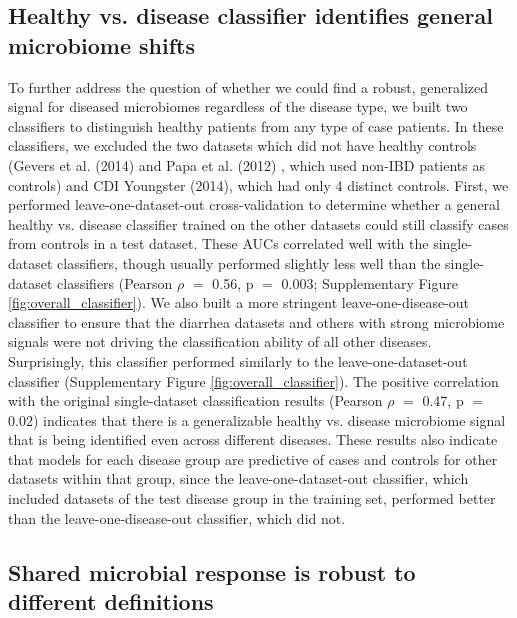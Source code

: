\subsection{Healthy vs. disease classifier identifies general microbiome shifts}\label{sec:overall_classifier}

To further address the question of whether we could find a robust, generalized signal for diseased microbiomes regardless of the disease type, we built two classifiers to distinguish healthy patients from any type of case patients.
In these classifiers, we excluded the two datasets which did not have healthy controls (Gevers et al. (2014) \cite{ibd-gevers}  and Papa et al. (2012) \cite{ibd-papa}, which used non-IBD patients as controls) and CDI Youngster (2014), \cite{cdi-youngster} which had only 4 distinct controls.
First, we performed leave-one-dataset-out cross-validation to determine whether a general healthy vs. disease classifier trained on the other datasets could still classify cases from controls in a test dataset.
These AUCs correlated well with the single-dataset classifiers, though usually performed slightly less well than the single-dataset classifiers (Pearson $\rho$ $=$ 0.56, p $=$ 0.003; Supplementary Figure \ref{fig:overall_classifier}).
We also built a more stringent leave-one-disease-out classifier to ensure that the diarrhea datasets and others with strong microbiome signals were not driving the classification ability of all other diseases.
Surprisingly, this classifier performed similarly to the leave-one-dataset-out classifier  (Supplementary Figure \ref{fig:overall_classifier}).
The positive correlation with the original single-dataset classification results (Pearson $\rho$ $=$ 0.47, p $=$ 0.02) indicates that there is a generalizable healthy vs. disease microbiome signal that is being identified even across different diseases.
These results also indicate that models for each disease group are predictive of cases and controls for other datasets within that group, since the leave-one-dataset-out classifier, which included datasets of the test disease group in the training set, performed better than the leave-one-disease-out classifier, which did not.

\subsection{Shared microbial response is robust to different definitions}\label{sec:core_defns}

